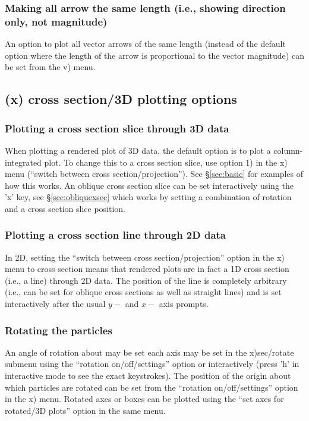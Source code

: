 \documentclass[a4paper,10pt]{article}
\begin{document}
\subsubsection{ Making all arrow the same length (i.e., showing direction only, not magnitude)}
 An option to plot all vector arrows of the same length (instead of the default option where the length of the arrow is proportional to the vector magnitude) can be set from the v) menu.

\subsection{(x) cross section/3D plotting options}

\subsubsection{ Plotting a cross section slice through 3D data}
 When plotting a rendered plot of 3D data, the default option is to plot a column-integrated plot. To change this to a cross section slice, use option 1) in the x) menu (``switch between cross section/projection''). See \S\ref{sec:basic} for examples of how this works. An oblique cross section slice can be set interactively using the 'x' key, see \S\ref{sec:obliquexsec} which works by setting a combination of rotation and a cross section slice position. 

\subsubsection{ Plotting a cross section line through 2D data}
 In 2D, setting the ``switch between cross section/projection'' option in the x) menu to cross section means that rendered plots are in fact a 1D cross section (i.e., a line) through 2D data. The position of the line is completely arbitrary (i.e., can be set for oblique cross sections as well as straight lines) and is set interactively after the usual $y-$ and $x-$ axis prompts.

\subsubsection{ Rotating the particles}
 An angle of rotation about may be set each axis may be set in the x)sec/rotate submenu using the ``rotation on/off/settings'' option or
interactively (press 'h' in interactive mode to see the exact keystrokes). The position of the origin about which particles are rotated can be set from the ``rotation on/off/settings'' option in the x) menu.
Rotated axes or boxes can be plotted using the ``set axes for rotated/3D plots'' option in the same menu.
\end{document}
